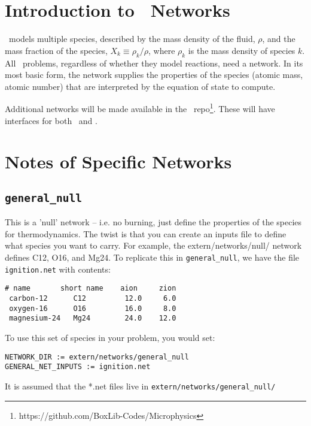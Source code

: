 \section{Introduction to \maestro\ Networks}

\maestro\ models multiple species, described by the mass density of
the fluid, $\rho$, and the mass fraction of the species, $X_k \equiv
\rho_k/\rho$, where $\rho_k$ is the mass density of species $k$.  All
\maestro\ problems, regardless of whether they model reactions, need a
network.  In its most basic form, the network supplies the properties
of the species (atomic mass, atomic number) that are interpreted by
the equation of state to compute.

Additional networks will be made available in the \microphysics\
repo\footnote{https://github.com/BoxLib-Codes/Microphysics}.  These
will have interfaces for both \maestro\ and \castro.

\section{Notes of Specific Networks}

\subsection{{\tt general\_null}}

This is a 'null' network -- i.e. no burning, just define the
properties of the species for thermodynamics.  The twist is that you
can create an inputs file to define what species you want to carry.
For example, the extern/networks/null/ network defines C12, O16, and
Mg24.  To replicate this in {\tt general\_null}, we have the file
{\tt ignition.net} with contents:

\begin{verbatim}
# name       short name    aion     zion
 carbon-12      C12         12.0     6.0
 oxygen-16      O16         16.0     8.0
 magnesium-24   Mg24        24.0    12.0
\end{verbatim}

To use this set of species in your problem, you would set:

\begin{verbatim}
NETWORK_DIR := extern/networks/general_null
GENERAL_NET_INPUTS := ignition.net
\end{verbatim}

It is assumed that the *.net files live in {\tt extern/networks/general\_null/}

